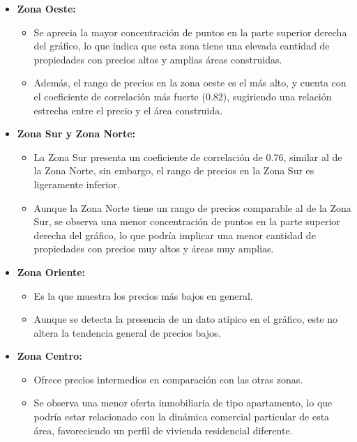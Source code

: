 \documentclass[
]{article}
\providecommand{\tightlist}{%
  \setlength{\itemsep}{0pt}\setlength{\parskip}{0pt}}
\begin{document}
\begin{itemize}
\tightlist
\item
  \textbf{Zona Oeste:}

  \begin{itemize}
  \tightlist
  \item
    Se aprecia la mayor concentración de puntos en la parte superior
    derecha del gráfico, lo que indica que esta zona tiene una elevada
    cantidad de propiedades con precios altos y amplias áreas
    construidas.\\
  \item
    Además, el rango de precios en la zona oeste es el más alto, y
    cuenta con el coeficiente de correlación más fuerte (0.82),
    sugiriendo una relación estrecha entre el precio y el área
    construida.
  \end{itemize}
\item
  \textbf{Zona Sur y Zona Norte:}

  \begin{itemize}
  \tightlist
  \item
    La Zona Sur presenta un coeficiente de correlación de 0.76, similar
    al de la Zona Norte, sin embargo, el rango de precios en la Zona Sur
    es ligeramente inferior.\\
  \item
    Aunque la Zona Norte tiene un rango de precios comparable al de la
    Zona Sur, se observa una menor concentración de puntos en la parte
    superior derecha del gráfico, lo que podría implicar una menor
    cantidad de propiedades con precios muy altos y áreas muy amplias.
  \end{itemize}
\item
  \textbf{Zona Oriente:}

  \begin{itemize}
  \tightlist
  \item
    Es la que muestra los precios más bajos en general.\\
  \item
    Aunque se detecta la presencia de un dato atípico en el gráfico,
    este no altera la tendencia general de precios bajos.
  \end{itemize}
\item
  \textbf{Zona Centro:}

  \begin{itemize}
  \tightlist
  \item
    Ofrece precios intermedios en comparación con las otras zonas.\\
  \item
    Se observa una menor oferta inmobiliaria de tipo apartamento, lo que
    podría estar relacionado con la dinámica comercial particular de
    esta área, favoreciendo un perfil de vivienda residencial diferente.
  \end{itemize}
\end{itemize}
\end{document}
